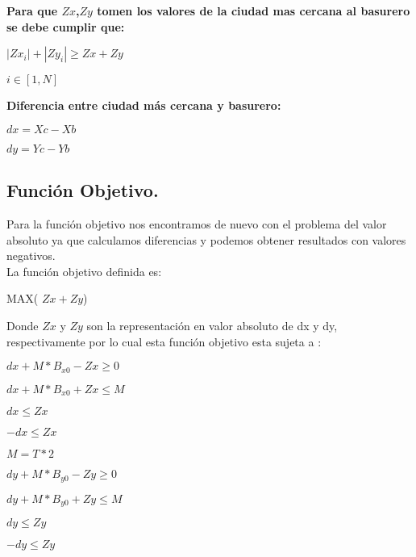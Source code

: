 \documentclass[10pt]{article}
\begin{document}
\textbf{Para que  $Zx$,$Zy$  tomen los valores de la ciudad mas cercana al basurero se debe cumplir que: }\\

\begin{center}

 
  $ |Zx_i| + |Zy_i| \geq Zx + Zy $
  
   
   $i \in [1,N]$
  
  

\end{center}


\textbf{Diferencia entre ciudad  m\'as cercana y basurero: }\\

\begin{center}

 
  $ dx = Xc - Xb $
  
   
   $dy = Yc - Yb$
  
  

\end{center}


\subsection{Funci\'on Objetivo.}

Para la funci\'on objetivo nos encontramos de nuevo con el problema del valor absoluto ya que calculamos diferencias y podemos obtener resultados con valores negativos.\\

La función objetivo definida es: 

\begin{center}
      MAX( $Zx + Zy$)
\end{center}

Donde $Zx$ y $Zy$ son la representaci\'on en valor absoluto de dx y dy, respectivamente por lo cual esta funci\'on objetivo esta sujeta a : 

\begin{center}
$dx + M*B_{x0} - Zx \geq 0 $

$dx + M*B_{x0} + Zx \leq M $

$dx \leq Zx $

$-dx \leq Zx$

$M=T*2$

\end{center}


\begin{center}
$dy + M*B_{y0} - Zy \geq 0 $

$dy + M*B_{y0} + Zy \leq M $

$dy \leq Zy $

$-dy \leq Zy$

\end{center}
\end{document}
